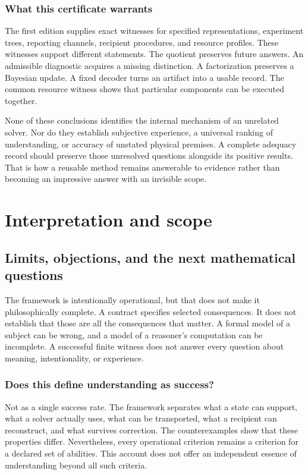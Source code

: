 \subsection{What this certificate warrants}
The first edition supplies exact witnesses for specified representations, experiment trees, reporting channels, recipient procedures, and resource profiles. These witnesses support different statements. The quotient preserves future answers. An admissible diagnostic acquires a missing distinction. A factorization preserves a Bayesian update. A fixed decoder turns an artifact into a usable record. The common resource witness shows that particular components can be executed together.

None of these conclusions identifies the internal mechanism of an unrelated solver. Nor do they establish subjective experience, a universal ranking of understanding, or accuracy of unstated physical premises. A complete adequacy record should preserve those unresolved questions alongside its positive results. That is how a reusable method remains answerable to evidence rather than becoming an impressive answer with an invisible scope.



\chapter{Interpretation and scope}\label{MU:book:chapter-49}


\section{Limits, objections, and the next mathematical questions}\label{MU:sec:limits}
The framework is intentionally operational, but that does not make it philosophically complete. A contract specifies selected consequences. It does not establish that those are all the consequences that matter. A formal model of a subject can be wrong, and a model of a reasoner's computation can be incomplete. A successful finite witness does not answer every question about meaning, intentionality, or experience.

\subsection{Does this define understanding as success?}
Not as a single success rate. The framework separates what a state can support, what a solver actually uses, what can be transported, what a recipient can reconstruct, and what survives correction. The counterexamples show that these properties differ. Nevertheless, every operational criterion remains a criterion for a declared set of abilities. This account does not offer an independent essence of understanding beyond all such criteria.

